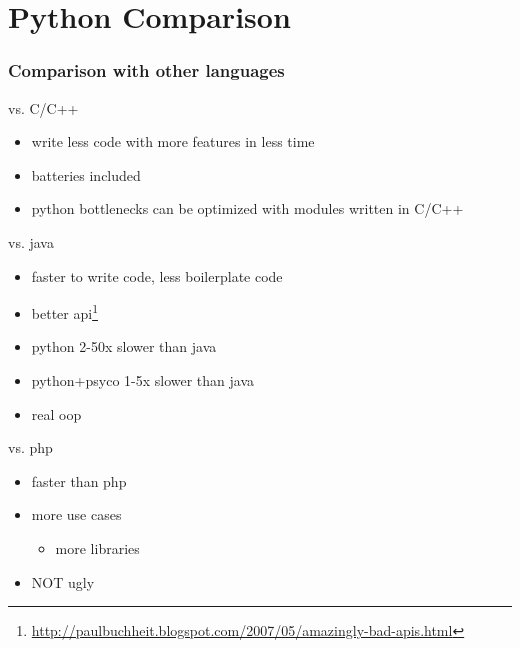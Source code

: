 \documentclass{beamer}
\begin{document}
\section{Python Comparison}	%
\begin{frame}
    \frametitle{Comparison with other languages}
    \begin{block}{vs. C/C++}
    \begin{itemize}
        \item write less code with more features in less time
        \item batteries included
        \item python bottlenecks can be optimized with modules written in C/C++
    \end{itemize}
    \end{block}
    \begin{block}{vs. java}
    \begin{itemize}
        \item faster to write code, less boilerplate code
        \item better api\footnote{\url{http://paulbuchheit.blogspot.com/2007/05/amazingly-bad-apis.html}}
        \item python 2-50x slower than java
        \item python+psyco 1-5x slower than java
        \item real oop
    \end{itemize}
    \end{block}
    
    \begin{block}{vs. php}
    \begin{itemize}
        \item faster than php
        \item more use cases
        \begin{itemize}
        	\item more libraries
        \end{itemize}
        \item NOT ugly
    \end{itemize}
    \end{block}


\end{frame}
\end{document}
